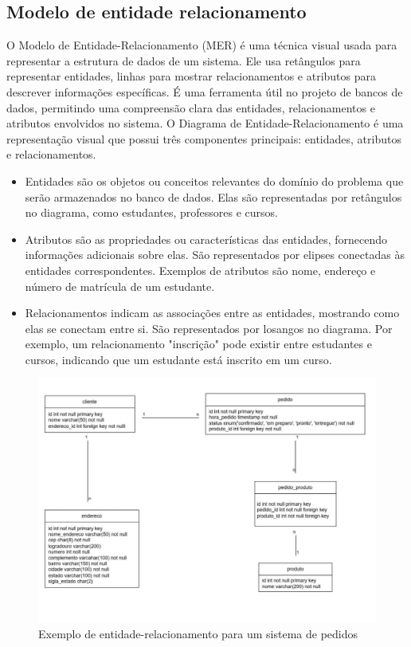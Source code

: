\documentclass[12pt]{article}
\begin{document}
\subsection{Modelo de entidade relacionamento}
O Modelo de Entidade-Relacionamento (MER) é uma técnica visual usada para representar a estrutura de dados de um sistema. Ele usa retângulos para representar entidades, linhas para mostrar relacionamentos e atributos para descrever informações específicas. É uma ferramenta útil no projeto de bancos de dados, permitindo uma compreensão clara das entidades, relacionamentos e atributos envolvidos no sistema. O Diagrama de Entidade-Relacionamento é uma representação visual que possui três componentes principais: entidades, atributos e relacionamentos.
\begin{itemize}
    \item Entidades são os objetos ou conceitos relevantes do domínio do problema que serão armazenados no banco de dados. Elas são representadas por retângulos no diagrama, como estudantes, professores e cursos.
    \item Atributos são as propriedades ou características das entidades, fornecendo informações adicionais sobre elas. São representados por elipses conectadas às entidades correspondentes. Exemplos de atributos são nome, endereço e número de matrícula de um estudante.
    \item Relacionamentos indicam as associações entre as entidades, mostrando como elas se conectam entre si. São representados por losangos no diagrama. Por exemplo, um relacionamento "inscrição" pode existir entre estudantes e cursos, indicando que um estudante está inscrito em um curso.
\end{itemize}
\begin{figure}[ht]
\centering
\includegraphics[width=.8\textwidth, scale=6.7]{modelo1.jpeg}
\caption{Exemplo de entidade-relacionamento para um sistema de pedidos}
\label{fig:typical-figure}
\end{figure}
\end{document}
